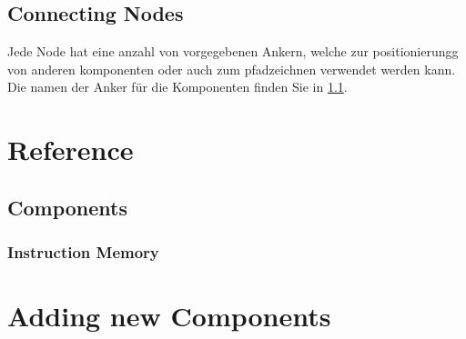 \documentclass[
	ngerman,
	accentcolor=9c,%
	type=intern,
	marginpar=false
	]{article}
\begin{document}



\subsection{Connecting Nodes}

Jede Node hat eine anzahl von vorgegebenen Ankern, welche zur positionierungg von anderen komponenten oder auch zum pfadzeichnen verwendet werden kann. Die namen der Anker für die Komponenten finden Sie in \ref{components}.



\section{Reference}
\subsection{Components}\label{components}

\subsubsection{Instruction Memory}





\section{Adding new Components}
\end{document}
